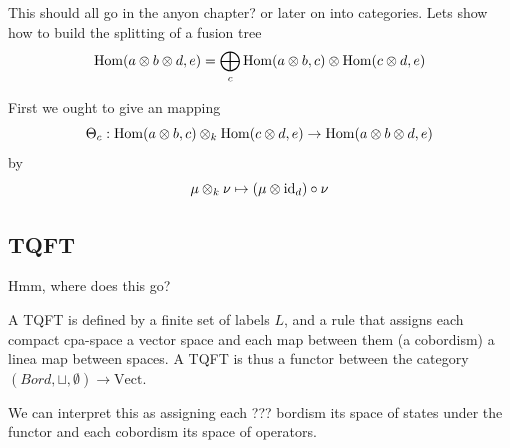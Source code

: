This should all go in the anyon chapter? or later on into categories. Lets show
how to build the splitting of a fusion tree 
\[
  \operatorname{Hom}(a \otimes b \otimes d, e) = \bigoplus_c \operatorname{Hom}(a \otimes b, c) \otimes \operatorname{Hom}(c \otimes d, e)
\]

First we ought to give an mapping 
\[
  \Theta_c : \operatorname{Hom}(a \otimes b, c) \otimes_k \operatorname{Hom}(c \otimes d, e) \to \operatorname{Hom}(a \otimes b \otimes d, e)
\]
by
\[
  \mu \otimes_k \nu \mapsto (\mu \otimes \operatorname{id}_d) \circ \nu
\]  

\subsection{TQFT}

Hmm, where does this go?

A TQFT is defined by a finite set of labels $L$, and a rule that assigns each
compact cpa-space a vector space and each map between them (a cobordism) a
linea map between spaces. A TQFT is thus a functor between the category $(Bord,
\sqcup, \emptyset) \to \mathrm{Vect}$.

We can interpret this as assigning each ??? bordism its space of states under
the functor and each cobordism its space of operators.

